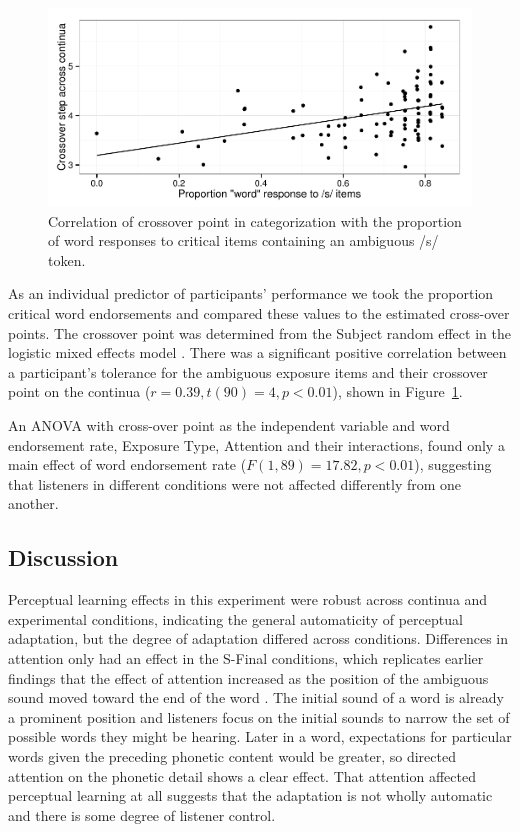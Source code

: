 \begin{figure}[!ht]

\caption{Correlation of crossover point in categorization with the proportion of word responses to critical items containing an ambiguous /s/ token.}\label{fig:exp1xover}
\begin{center}
\includegraphics[width=\textwidth]{graphs/exp1_xoverwordresp}
\end{center}
\end{figure}

As an individual predictor of participants' performance we took the proportion critical word endorsements and compared these values to the estimated cross-over points. 
The crossover point was determined from the Subject random effect in the logistic mixed effects model \citep{Kleber2012}. 
There was a significant positive correlation between a participant's tolerance for the ambiguous exposure items and their crossover point on the continua ($r = 0.39, t (90) = 4, p < 0.01$), shown in Figure~\ref{fig:exp1xover}.

An ANOVA with cross-over point as the independent variable and word endorsement rate, Exposure Type, Attention and their interactions, found only a main effect of word endorsement rate ($F(1,89) = 17.82, p < 0.01$), suggesting that listeners in different conditions were not affected differently from one another.

\subsection{Discussion}

Perceptual learning effects in this experiment were robust across continua and experimental conditions, indicating the general automaticity of perceptual adaptation, but the degree of adaptation differed across conditions. 
Differences in attention only had an effect in the S-Final conditions, which replicates earlier findings that the effect of attention increased as the position of the ambiguous sound moved toward the end of the word \cite{Pitt2012}.  
The initial sound of a word is already a prominent position and listeners focus on the initial sounds to narrow the set of possible words they might be hearing. 
Later in a word, expectations for particular words given the preceding phonetic content would be greater, so directed attention on the phonetic detail shows a clear effect.  
That attention affected perceptual learning at all suggests that the adaptation is not wholly automatic and there is some degree of listener control.

